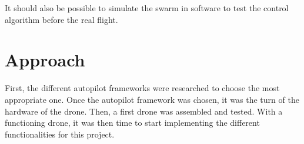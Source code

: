 It should also be possible to simulate the swarm in software to test the control algorithm before the real flight.

\section{Approach}

First, the different autopilot frameworks were researched to choose the most appropriate one.
Once the autopilot framework was chosen, it was the turn of the hardware of the drone.
Then, a first drone was assembled and tested.
With a functioning drone, it was then time to start implementing the different functionalities for this project.
